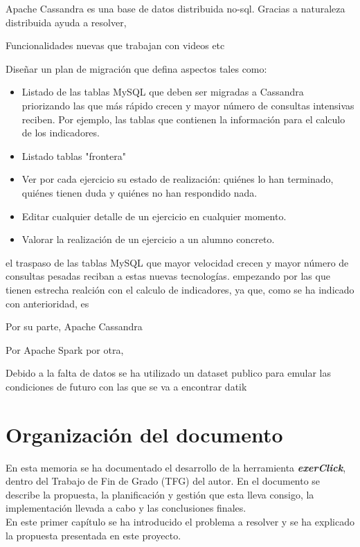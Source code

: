 Apache Cassandra es una base de datos distribuida no-sql. Gracias a naturaleza distribuida ayuda a resolver, 

Funcionalidades nuevas que trabajan con videos etc




Diseñar un plan de migración que defina aspectos tales como: 

\begin{itemize}
	\item Listado de las tablas MySQL que deben ser migradas a Cassandra priorizando las que más rápido crecen y mayor número de consultas intensivas reciben. Por ejemplo, las tablas que contienen la información para el calculo de los indicadores.
	\item Listado tablas "frontera"
	\item Ver por cada ejercicio su estado de realización: quiénes lo han terminado, quiénes tienen duda y quiénes no han respondido nada.
	\item Editar cualquier detalle de un ejercicio en cualquier momento.
	\item Valorar la realización de un ejercicio a un alumno concreto.
\end{itemize}

el traspaso de las tablas MySQL que mayor velocidad crecen  y mayor número de consultas pesadas reciban a estas nuevas tecnologías. empezando por las que tienen estrecha realción con el calculo de indicadores, ya que, como se ha indicado con anterioridad, es  

Por su parte, Apache Cassandra

Por Apache Spark por otra,

Debido a la falta de datos se ha utilizado un dataset publico para emular las condiciones de futuro con las que se va a encontrar datik

\section{Organización del documento}

En esta memoria se ha documentado  el desarrollo de la herramienta \textbf{\textit{exerClick}}, dentro del Trabajo de Fin de Grado (TFG) del autor. En el documento se describe la propuesta, la planificación y gestión que esta lleva consigo, la implementación llevada a cabo y las conclusiones finales.\\

En este primer capítulo se ha introducido el problema a resolver y se ha explicado la propuesta presentada en este proyecto.\\

